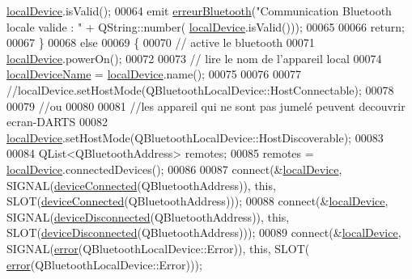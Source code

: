 \begin{DoxyCode}
      \hyperlink{class_communication_a6281796eab7523bef6be1a766e0e906f}{localDevice}.isValid();
00064         emit \hyperlink{class_communication_a9cb85e46b57b6dfa9e71408010bfc0a9}{erreurBluetooth}(\textcolor{stringliteral}{"Communication Bluetooth locale valide : "} + QString::number(
      \hyperlink{class_communication_a6281796eab7523bef6be1a766e0e906f}{localDevice}.isValid()));
00065 
00066         \textcolor{keywordflow}{return};
00067     \}
00068     \textcolor{keywordflow}{else}
00069     \{
00070         \textcolor{comment}{// active le bluetooth}
00071         \hyperlink{class_communication_a6281796eab7523bef6be1a766e0e906f}{localDevice}.powerOn();
00072 
00073         \textcolor{comment}{// lire le nom de l'appareil local}
00074         \hyperlink{class_communication_aa70c6b4acb921b03ffa8b8b044e87a94}{localDeviceName} = \hyperlink{class_communication_a6281796eab7523bef6be1a766e0e906f}{localDevice}.name();
00075 
00076 
00077         \textcolor{comment}{//localDevice.setHostMode(QBluetoothLocalDevice::HostConnectable);}
00078 
00079         \textcolor{comment}{//ou}
00080 
00081         \textcolor{comment}{//les appareil qui ne sont pas jumelé peuvent decouvrir ecran-DARTS}
00082         \hyperlink{class_communication_a6281796eab7523bef6be1a766e0e906f}{localDevice}.setHostMode(QBluetoothLocalDevice::HostDiscoverable);
00083 
00084         QList<QBluetoothAddress> remotes;
00085         remotes = \hyperlink{class_communication_a6281796eab7523bef6be1a766e0e906f}{localDevice}.connectedDevices();
00086 
00087         connect(&\hyperlink{class_communication_a6281796eab7523bef6be1a766e0e906f}{localDevice}, SIGNAL(\hyperlink{class_communication_a33db5c9db5da71c20c8c544d1de4eb9a}{deviceConnected}(QBluetoothAddress)), \textcolor{keyword}{this}, 
      SLOT(\hyperlink{class_communication_a33db5c9db5da71c20c8c544d1de4eb9a}{deviceConnected}(QBluetoothAddress)));
00088         connect(&\hyperlink{class_communication_a6281796eab7523bef6be1a766e0e906f}{localDevice}, SIGNAL(\hyperlink{class_communication_a0ee021f517bb0e3f7149ed13f8faf0b1}{deviceDisconnected}(QBluetoothAddress)), \textcolor{keyword}{
      this}, SLOT(\hyperlink{class_communication_a0ee021f517bb0e3f7149ed13f8faf0b1}{deviceDisconnected}(QBluetoothAddress)));
00089         connect(&\hyperlink{class_communication_a6281796eab7523bef6be1a766e0e906f}{localDevice}, SIGNAL(\hyperlink{class_communication_af95addb3c2bc178cfd7c92c6f94680a4}{error}(QBluetoothLocalDevice::Error)), \textcolor{keyword}{this}, SLOT(
      \hyperlink{class_communication_af95addb3c2bc178cfd7c92c6f94680a4}{error}(QBluetoothLocalDevice::Error)));

\end{DoxyCode}
